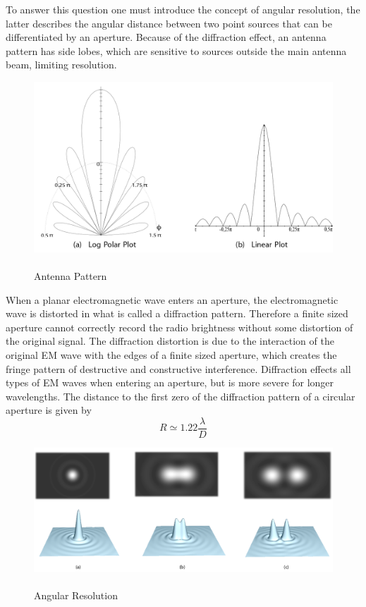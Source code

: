 To answer this question one must introduce the concept of angular resolution, the latter describes the angular distance between two point sources that can be differentiated by an aperture. Because of the diffraction effect, an antenna pattern has side lobes,
which are sensitive to sources outside the main antenna beam, limiting resolution. 
\begin{figure}[htbp]

  \begin{center}
    \includegraphics[scale= 1]{Figures/AntennaPattern}
  \end{center}
  
 	\caption[Antenna Pattern]{\\Antenna Pattern}
	\label{fig:AntPat}
\end{figure}
When a planar electromagnetic wave enters an aperture, the electromagnetic wave is distorted in what is called a diffraction pattern. Therefore a finite sized aperture cannot correctly record the radio brightness without some distortion of the original signal. The diffraction distortion is due to the interaction of the original EM wave with the edges of a finite sized aperture, which creates the fringe pattern of destructive and constructive interference. Diffraction effects all types of EM waves when entering an aperture, but is more severe for longer wavelengths. The distance to the first zero of the diffraction pattern of a circular aperture is given by
\begin{equation}
R \simeq 1.22\frac{\lambda}{D} 
\end{equation}
\begin{figure}[htbp]

  \begin{center}
    \includegraphics[scale= 0.75]{Figures/angres}
  \end{center}
  
 	\caption[Angular Resolution]{\\Angular Resolution}
	\label{fig:Ang}
\end{figure}
